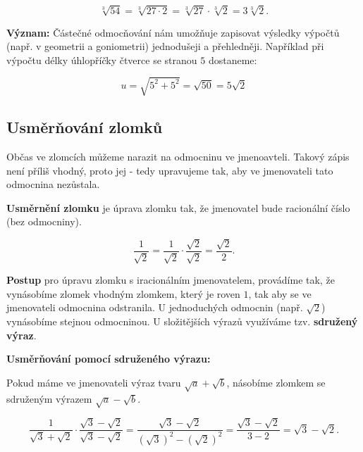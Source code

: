 \documentclass[12pt,a4paper]{article}
\begin{document}
\begin{examplebox}
    \[
    \sqrt[3]{54} = \sqrt[3]{27 \cdot 2} = \sqrt[3]{27} \cdot \sqrt[3]{2} = 3\sqrt[3]{2}.
    \]
\end{examplebox}

\textbf{Význam:}
Částečné odmocňování nám umožňuje zapisovat výsledky výpočtů (např. v geometrii a goniometrii) jednodušeji a přehledněji.
Například při výpočtu délky úhlopříčky čtverce se stranou $5$ dostaneme:

\[
u = \sqrt{5^2 + 5^2} = \sqrt{50} = 5\sqrt{2}
\]


\subsection{Usměrňování zlomků}

Občas ve zlomcích můžeme narazit na odmocninu ve jmenoavteli.
Takový zápis není příliš vhodný, proto jej  - tedy upravujeme tak, aby ve jmenovateli tato odmocnina nezůstala.

\begin{definitionbox}
\textbf{Usměrnění zlomku} je úprava zlomku tak, že jmenovatel bude racionální číslo (bez odmocniny).
\end{definitionbox}

\begin{examplebox}
    \[
    \frac{1}{\sqrt{2}} = \frac{1}{\sqrt{2}} \cdot \frac{\sqrt{2}}{\sqrt{2}} = \frac{\sqrt{2}}{2}.
    \]
\end{examplebox}

\textbf{Postup}
pro úpravu zlomku s iracionálním jmenovatelem, provádíme tak, že vynásobíme zlomek vhodným zlomkem, který je roven $1$, tak aby se ve jmenovateli odmocnina odstranila.
U jednoduchých odmocnin (např. $\sqrt{2}$) vynásobíme stejnou odmocninou.
U složitějších výrazů využíváme tzv. \textbf{sdružený výraz}.



\textbf{Usměrňování pomocí sdruženého výrazu:}

Pokud máme ve jmenovateli výraz tvaru $\sqrt{a} + \sqrt{b}$, násobíme zlomkem se sdruženým výrazem $\sqrt{a} - \sqrt{b}$.  

\begin{examplebox}
\[
\frac{1}{\sqrt{3}+\sqrt{2}} \cdot \frac{\sqrt{3}-\sqrt{2}}{\sqrt{3}-\sqrt{2}}
= \frac{\sqrt{3}-\sqrt{2}}{(\sqrt{3})^2-(\sqrt{2})^2}
= \frac{\sqrt{3}-\sqrt{2}}{3-2}
= \sqrt{3}-\sqrt{2}.
\]
\end{examplebox}
\end{document}
